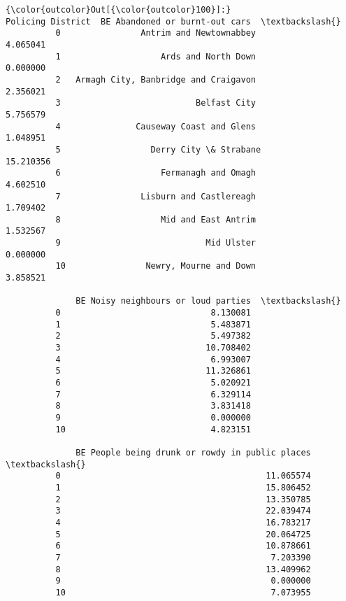 \documentclass[11pt]{article}
\begin{document}
\begin{Verbatim}[commandchars=\\\{\}]
{\color{outcolor}Out[{\color{outcolor}100}]:}                        Policing District  BE Abandoned or burnt-out cars  \textbackslash{}
          0                Antrim and Newtownabbey                        4.065041   
          1                    Ards and North Down                        0.000000   
          2   Armagh City, Banbridge and Craigavon                        2.356021   
          3                           Belfast City                        5.756579   
          4               Causeway Coast and Glens                        1.048951   
          5                  Derry City \& Strabane                       15.210356   
          6                    Fermanagh and Omagh                        4.602510   
          7                Lisburn and Castlereagh                        1.709402   
          8                    Mid and East Antrim                        1.532567   
          9                             Mid Ulster                        0.000000   
          10                Newry, Mourne and Down                        3.858521   
          
              BE Noisy neighbours or loud parties  \textbackslash{}
          0                              8.130081   
          1                              5.483871   
          2                              5.497382   
          3                             10.708402   
          4                              6.993007   
          5                             11.326861   
          6                              5.020921   
          7                              6.329114   
          8                              3.831418   
          9                              0.000000   
          10                             4.823151   
          
              BE People being drunk or rowdy in public places  \textbackslash{}
          0                                         11.065574   
          1                                         15.806452   
          2                                         13.350785   
          3                                         22.039474   
          4                                         16.783217   
          5                                         20.064725   
          6                                         10.878661   
          7                                          7.203390   
          8                                         13.409962   
          9                                          0.000000   
          10                                         7.073955   
          

\end{Verbatim}
\end{document}
